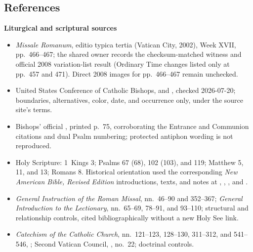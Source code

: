 \begin{deepstudy}
\section*{References}

\textbf{Liturgical and scriptural sources}
{\fontsize{7.8}{8.5}\selectfont
\begin{itemize}[itemsep=0em,topsep=0.15em,parsep=0pt]
\item \emph{Missale Romanum}, editio typica tertia (Vatican City, 2002), Week XVII, pp.~466--467; the shared owner records the checksum-matched witness and official 2008 variation-list result (Ordinary Time changes listed only at pp.~457 and 471). Direct 2008 images for pp.~466--467 remain unchecked.
\item United States Conference of Catholic Bishops,  and , checked 2026-07-20; boundaries, alternatives, color, date, and occurrence only, under the source site's terms.
\item Bishops' official , printed p.~75, corroborating the Entrance and Communion citations and dual Psalm numbering; protected antiphon wording is not reproduced.
\item Holy Scripture: 1~Kings 3; Psalms 67 (68), 102 (103), and 119; Matthew 5, 11, and 13; Romans 8. Historical orientation used the corresponding \emph{New American Bible, Revised Edition} introductions, texts, and notes at , , , and .
\item \emph{General Instruction of the Roman Missal}, nn.~46--90 and 352--367; \emph{General Introduction to the Lectionary}, nn.~65--69, 78--91, and 93--110; structural and relationship controls, cited bibliographically without a new Holy See link.
\item \emph{Catechism of the Catholic Church}, nn.~121--123, 128--130, 311--312, and 541--546, ; Second Vatican Council, , no.~22; doctrinal controls.
\end{itemize}}


\end{deepstudy}

